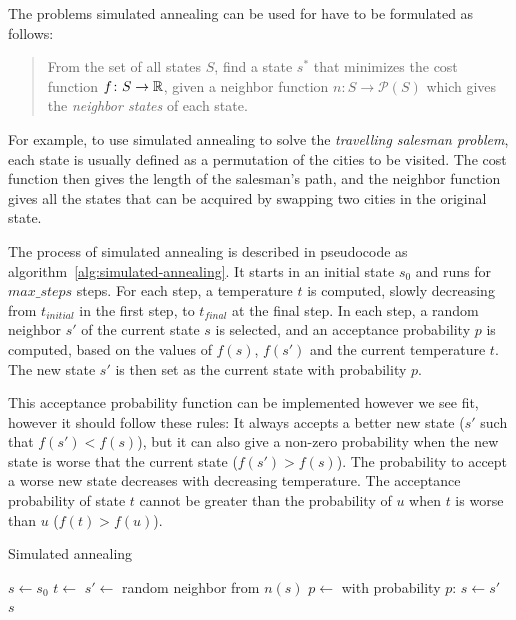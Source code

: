 The problems simulated annealing can be used for have to be formulated as follows:
\begin{quotation}
    From the set of all states $S$, find a state $s^*$ that minimizes the cost function $f \colon S \to \mathbb{R}$, given a neighbor function $n \colon S \to \mathcal{P}(S)$ which gives the \emph{neighbor states} of each state.
\end{quotation}
For example, to use simulated annealing to solve the \emph{travelling salesman problem}, each state is usually defined as a permutation of the cities to be visited.
The cost function then gives the length of the salesman's path, and the neighbor function gives all the states that can be acquired by swapping two cities in the original state.

The process of simulated annealing is described in pseudocode as algorithm~\ref{alg:simulated-annealing}.
It starts in an initial state $s_0$ and runs for $max\_steps$ steps.
For each step, a temperature $t$ is computed, slowly decreasing from $t_{initial}$ in the first step, to $t_{final}$ at the final step.
In each step, a random neighbor $s'$ of the current state $s$ is selected, and an acceptance probability $p$ is computed, based on the values of $f(s)$, $f(s')$ and the current temperature $t$.
The new state $s'$ is then set as the current state with probability $p$.

This acceptance probability function can be implemented however we see fit, however it should follow these rules:
It always accepts a better new state ($s'$ such that $f(s') < f(s)$), but it can also give a non-zero probability when the new state is worse that the current state ($f(s') > f(s)$).
The probability to accept a worse new state decreases with decreasing temperature.
The acceptance probability of state $t$ cannot be greater than the probability of $u$ when $t$ is worse than $u$ ($f(t) > f(u)$).

\begin{algorithm}[H]
    \caption{Simulated annealing}
    \label{alg:simulated-annealing}
    \begin{algorithmic}[1]
        \State $s \gets s_0$
        \State $t \gets$ 
        \State $s' \gets$ random neighbor from $n(s)$
        \State $p \gets$ 
        \State with probability $p$: $s \gets s'$
        \EndFor\\
        \Return $s$
        \Statex
    \end{algorithmic}
\end{algorithm}

